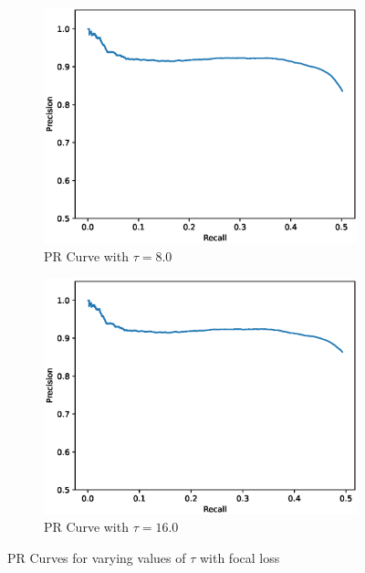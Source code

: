 \documentclass[letter]{article}
\begin{document}
\begin{figure}[!h]
		\begin{subfigure}[t]{0.4\textwidth}
			\centering
			\includegraphics[width=\linewidth]{images/plot_tau_8_focal.eps}
			\caption{PR Curve with $\tau=8.0$}
		\end{subfigure}
		\begin{subfigure}[t]{0.4\textwidth}
			\centering
			\includegraphics[width=\linewidth]{images/plot_tau_16_focal.eps}
			\caption{PR Curve with $\tau=16.0$}
		\end{subfigure}

		\caption{PR Curves for varying values of $\tau$ with focal loss}
		\label{fig:prcurvefocal}
	\end{figure}
\end{document}
